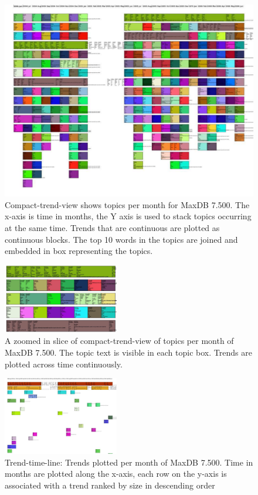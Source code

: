 \documentclass[times, 10pt,twocolumn]{article}
\begin{document}
\begin{figure}
  \centering
  \includegraphics[width=1.0\textwidth]{fixed-time-smear-plot-scaled}
  \caption{Compact-trend-view shows topics per month for MaxDB
    7.500. The x-axis is time in months, the Y axis is used to stack
    topics occurring at the same time. Trends that are continuous are
    plotted as continuous blocks. The top 10 words in the topics are
    joined and embedded in box representing the topics.}
  \label{fig:topicsmear}
\end{figure}


\begin{figure}
  \centering
  \includegraphics[width=0.45\textwidth]{fixed-time-smear-plot-cropped}
  \caption{A zoomed in slice of compact-trend-view of topics per month of MaxDB 7.500. The topic text is visible in each topic box. Trends are plotted across time continuously.}
  \label{fig:zoomedsmear}
\end{figure}


\begin{figure}
  \centering
  \includegraphics[width=0.45\textwidth]{class-smear-plot-crop-scaled}
  \caption{Trend-time-line: Trends plotted per month of MaxDB 7.500. Time in months are plotted along the x-axis, each row on the y-axis is associated with a trend ranked by size in descending order}         
  \label{fig:trendtimeline}
\end{figure}
\end{document}
